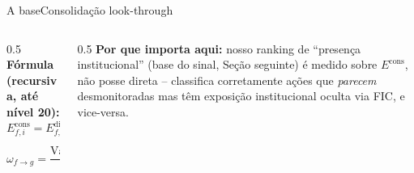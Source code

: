 \documentclass[aspectratio=169,9pt]{beamer}
\newcommand{\sechead}[1]{{\bfseries\color{navy}#1}}
\begin{document}
\begin{frame}{A base}{Consolidação look-through}
\vspace{6pt}
\begin{columns}[T]
\begin{column}{0.5\textwidth}
\footnotesize\textbf{\sechead{Fórmula (recursiva, até nível 20):}}
\[
E^{\text{cons}}_{f,i} = E^{\text{direta}}_{f,i} +\!\!\sum_{g\,\in\,\text{cotas de }f}\!\! \omega_{f\to g}\cdot E^{\text{cons}}_{g,i}
\]
\[
\omega_{f\to g} = \dfrac{\text{Valor de }f\text{ em cotas de }g}{\text{PL de }g}
\]
\end{column}
\begin{column}{0.5\textwidth}
\footnotesize\textbf{\sechead{Por que importa aqui:}} nosso ranking de
``presença institucional'' (base do sinal, Seção seguinte) é medido sobre
$E^{\text{cons}}$, não posse direta -- classifica corretamente ações que
\emph{parecem} desmonitoradas mas têm exposição institucional oculta via FIC,
e vice-versa.
\end{column}
\end{columns}
\end{frame}
\end{document}
